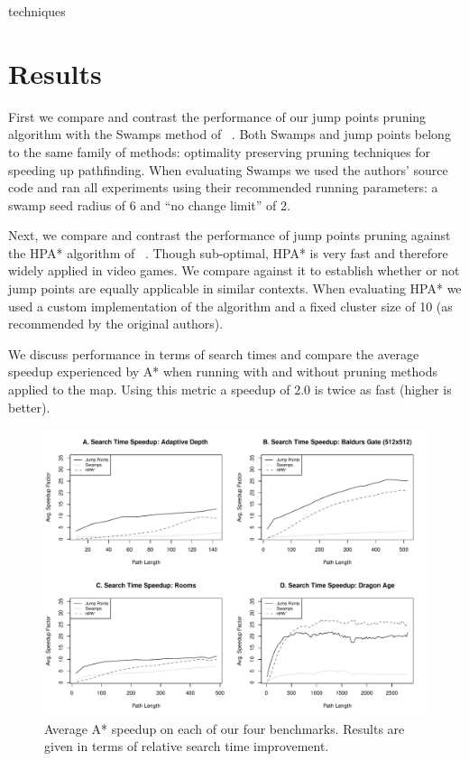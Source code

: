 techniques\section{Results}
First we compare and contrast the performance of our jump points
pruning algorithm with the Swamps method of
\citeauthor{pochter10}~. 
Both Swamps and jump points belong to the same family of methods:
optimality preserving pruning techniques for speeding up pathfinding.
When evaluating Swamps we used the authors'
source code and ran all experiments using their recommended running parameters:
a swamp seed radius of 6 and ``no change limit'' of 2. 
\par
Next, we compare and contrast the performance of jump points pruning 
against the HPA* algorithm of \citeauthor{botea04}~.
Though sub-optimal, HPA* is very fast and therefore widely applied in video
games. We compare against it to establish whether or not jump points are 
equally applicable in similar contexts. 
When evaluating HPA* we used a custom implementation of the algorithm and a
fixed cluster size of 10 (as recommended by the original authors).
\par
We discuss performance in terms of search times and compare 
the average speedup experienced by A* when running with and
without pruning methods applied to the map.  
Using this metric a speedup of 2.0 is twice as fast (higher is better).

\begin{figure}[t]
   \begin{center}
	   \includegraphics[width=2.0\columnwidth, trim = 10mm 10mm 10mm 0mm]
		{diagrams/speedup.pdf}
   \end{center}
   \caption{Average A* speedup on each of our four benchmarks. 
	Results are given in terms of relative search time improvement.}
\label{fig:speedup}
\end{figure}

